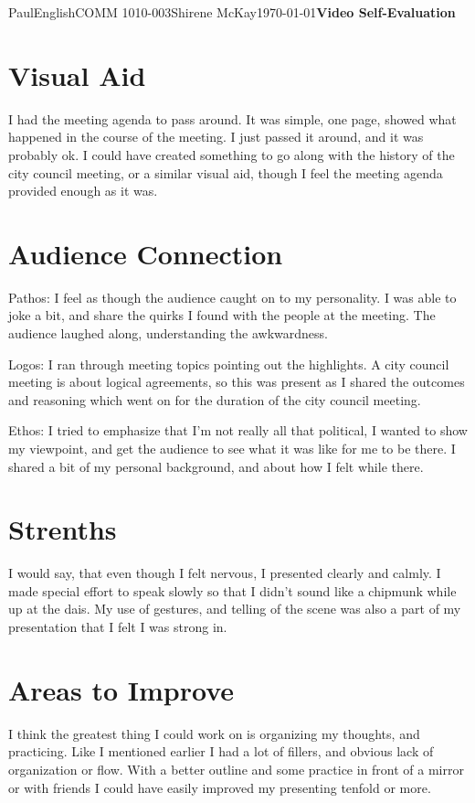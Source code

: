 \documentclass[12pt,letterpaper]{article}
\begin{document}
\begin{mla}{Paul}{English}{COMM 1010-003}{Shirene McKay}{\today}{\textbf{Video Self-Evaluation}}
\section{Visual Aid}
I had the meeting agenda to pass around. It was simple, one page,
showed what happened in the course of the meeting. I just passed it
around, and it was probably ok. I could have created something to go
along with the history of the city council meeting, or a similar
visual aid, though I feel the meeting agenda provided enough as it was.

\section{Audience Connection}
Pathos: I feel as though the audience caught on to my personality. I
was able to joke a bit, and share the quirks I found with the people
at the meeting. The audience laughed along, understanding the
awkwardness.

Logos: I ran through meeting topics pointing out the highlights. A
city council meeting is about logical agreements, so this was present
as I shared the outcomes and reasoning which went on for the duration
of the city council meeting.

Ethos: I tried to emphasize that I'm not really all that political, I
wanted to show my viewpoint, and get the audience to see what it was
like for me to be there. I shared a bit of my personal background, and
about how I felt while there.

\section{Strenths}
I would say, that even though I felt nervous, I presented clearly and
calmly. I made special effort to speak slowly so that I didn't sound
like a chipmunk while up at the dais. My use of gestures, and telling
of the scene was also a part of my presentation that I felt I was
strong in.

\section{Areas to Improve}
I think the greatest thing I could work on is organizing my thoughts,
and practicing. Like I mentioned earlier I had a lot of fillers, and
obvious lack of organization or flow. With a better outline and some
practice in front of a mirror or with friends I could have easily
improved my presenting tenfold or more.

\end{mla}
\end{document}
